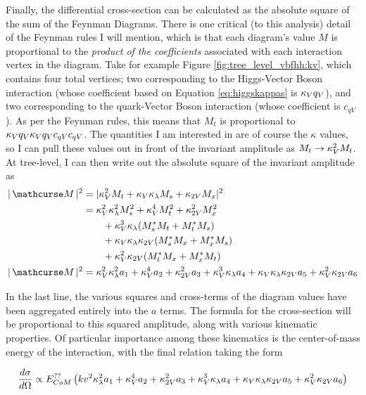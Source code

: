     Finally, the differential cross-section can be calculated as the absolute square of the sum of the Feynman Diagrams.
    There is one critical (to this analysis) detail of the Feynman rules I will mention,
        which is that each diagram's value $M$ is proportional to the \textit{product of the coefficients}
        associated with each interaction vertex in the diagram.
    Take for example Figure \ref{fig:tree_level_vbfhh:kv}, which contains four total vertices;
        two corresponding to the Higgs-Vector Boson interaction (whose coefficient based on Equation \ref{eq:higgskappas} is $\kappa_{V} q_V$),
        and two corresponding to the quark-Vector Boson interaction (whose coefficient is $c_{qV}$).
    As per the Feynman rules, this means that $M_t$ is proportional to $\kappa_{V} q_V \kappa_{V} q_V c_{qV} c_{qV}$.
    The quantities I am interested in are of course the $\kappa$ values,
        so I can pull these values out in front of the invariant amplitude as $M_t \rightarrow \kappa_{V}^2 M_t$.
    At tree-level, I can then write out the absolute square of the invariant amplitude as
    \begin{equation} \begin{split}
        |\invAmp|^2 &= |  \kv^2 M_t + \kv \kl M_s + \kvv M_x |^2
        \\&= \kv^2 \kl^2 M_s^2 + \kv^4 M_t^2 + \kvv^2 M_x^2 
            \\&\qquad + \kv^3 \kl (M_s^* M_t + M_t^* M_s) 
            \\&\qquad + \kv \kl \kvv (M_s^* M_x + M_x^* M_s ) 
            \\&\qquad + \kv^2 \kvv (M_t^* M_x + M_x^* M_t )
        \\|\invAmp|^2 &= \kv^2 \kl^2 a_1 + \kv^4 a_2 + \kvv^2 a_3 + \kv^3 \kl a_4 + \kv \kl \kvv a_5 + \kv^2 \kvv a_6
    \end{split} \end{equation}

    In the last line, the various squares and cross-terms of the diagram values have been aggregated entirely into the $a$ terms.
    The formula for the cross-section will be proportional to this squared amplitude, along with various kinematic properties.
    Of particular importance among these kinematics is the center-of-mass energy of the interaction, with the final relation taking the form

    \begin{equation} \label{eq:dXsec_final} %
        \dXsec \propto E_{CoM}^{??}\left(kv^2 \kl^2 a_1 + \kv^4 a_2 + \kvv^2 a_3 + \kv^3 \kl a_4 + \kv \kl \kvv a_5 + \kv^2 \kvv a_6 \right)
    \end{equation}


